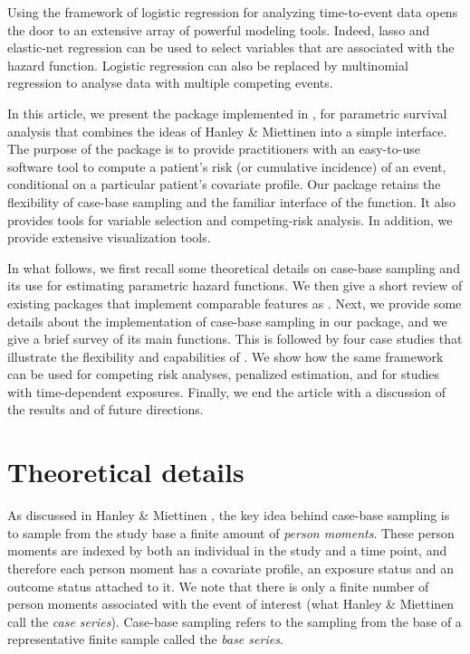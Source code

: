 \documentclass[
]{jss}
\begin{document}
Using the framework of logistic regression for analyzing time-to-event
data opens the door to an extensive array of powerful modeling tools.
Indeed, lasso and elastic-net regression can be used to select variables
that are associated with the hazard function. Logistic regression can
also be replaced by multinomial regression to analyse data with multiple
competing events.

In this article, we present the  package
\citep{casebase-package} implemented in  \citep{r-core}, for
parametric survival analysis that combines the ideas of Hanley \&
Miettinen \citeyearpar{hanley2009fitting} into a simple interface. The
purpose of the  package is to provide practitioners with
an easy-to-use software tool to compute a patient's risk (or cumulative
incidence) of an event, conditional on a particular patient's covariate
profile. Our package retains the flexibility of case-base sampling and
the familiar interface of the  function. It also provides
tools for variable selection and competing-risk analysis. In addition,
we provide extensive visualization tools.

In what follows, we first recall some theoretical details on case-base
sampling and its use for estimating parametric hazard functions. We then
give a short review of existing  packages that implement
comparable features as . Next, we provide some details
about the implementation of case-base sampling in our package, and we
give a brief survey of its main functions. This is followed by four case
studies that illustrate the flexibility and capabilities of
. We show how the same framework can be used for competing
risk analyses, penalized estimation, and for studies with time-dependent
exposures. Finally, we end the article with a discussion of the results
and of future directions.

\hypertarget{theory}{%
\section{Theoretical details}\label{theory}}

As discussed in Hanley \& Miettinen \citeyearpar{hanley2009fitting}, the
key idea behind case-base sampling is to sample from the study base a
finite amount of \emph{person moments}. These person moments are indexed
by both an individual in the study and a time point, and therefore each
person moment has a covariate profile, an exposure status and an outcome
status attached to it. We note that there is only a finite number of
person moments associated with the event of interest (what Hanley \&
Miettinen call the \emph{case series}). Case-base sampling refers to the
sampling from the base of a representative finite sample called the
\emph{base series}.
\end{document}
